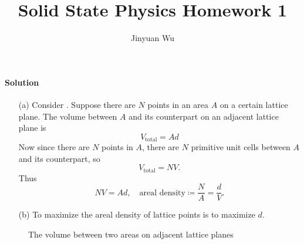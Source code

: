 \documentclass[hyperref, a4paper]{article}
\title{Solid State Physics Homework 1}
\author{Jinyuan Wu}
\begin{document}
\maketitle


\paragraph{Solution} 
\begin{itemize}
\item[(a)] Consider . Suppose there are $N$ points in an area $A$
on a certain lattice plane.
The volume between $A$ and its counterpart on an adjacent lattice plane is 
\[
    V_{\text{total}} = A d
\]
Now since there are $N$ points in $A$,
there are $N$ primitive unit cells between $A$ and its counterpart, so 
\[
    V_{\text{total}} = N V.
\]
Thus 
\begin{equation}
    NV = Ad, \quad \text{areal density} \coloneqq \frac{N}{A} = \frac{d}{V}.
\end{equation}
\item[(b)] To maximize the areal density of lattice points is to maximize $d$.

\end{itemize}

\begin{figure}
    \centering
    
    \caption{The volume between two areas on adjacent lattice planes}
    \label{fig:volume-between}
\end{figure}
\end{document}
